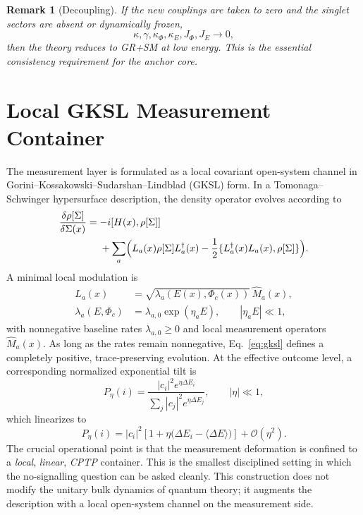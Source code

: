 \documentclass[aps,prd,twocolumn,superscriptaddress,nofootinbib]{revtex4-2}
\newtheorem{remark}{Remark}
\begin{document}
\begin{remark}[Decoupling]
If the new couplings are taken to zero and the singlet sectors are absent or dynamically frozen,
\begin{equation}
\kappa,\gamma,\kappa_{\Phi},\kappa_E,J_{\Phi},J_E\to 0,
\end{equation}
then the theory reduces to GR+SM at low energy. This is the essential consistency requirement for the anchor core.
\end{remark}

\section{Local GKSL Measurement Container}
The measurement layer is formulated as a local covariant open-system channel in Gorini--Kossakowski--Sudarshan--Lindblad (GKSL) form. In a Tomonaga--Schwinger hypersurface description, the density operator evolves according to
\begin{equation}
\begin{split}
\frac{\delta\rho[\Sigma]}{\delta\Sigma(x)} = {}&{-}i[H(x),\rho[\Sigma]] \\
&+ \sum_a \Bigl(L_a(x)\rho[\Sigma]L_a^{\dagger}(x)-\frac{1}{2}\{L_a^{\dagger}(x)L_a(x),\rho[\Sigma]\}\Bigr).
\end{split}
\label{eq:gksl}
\end{equation}
A minimal local modulation is
\begin{equation}
\begin{split}
L_a(x) &= \sqrt{\lambda_a(E(x),\Phi_c(x))}\,\hat M_a(x), \\
\lambda_a(E,\Phi_c) &= \lambda_{a,0}\exp(\eta_a E),\qquad |\eta_a E|\ll 1,
\end{split}
\label{eq:locallambda}
\end{equation}
with nonnegative baseline rates $\lambda_{a,0}\ge 0$ and local measurement operators $\hat M_a(x)$. As long as the rates remain nonnegative, Eq.~\eqref{eq:gksl} defines a completely positive, trace-preserving evolution. At the effective outcome level, a corresponding normalized exponential tilt is
\begin{equation}
P_{\eta}(i)=\frac{|c_i|^2 e^{\eta\Delta E_i}}{\sum_j |c_j|^2 e^{\eta\Delta E_j}},\qquad |\eta|\ll 1,
\label{eq:measuretilt}
\end{equation}
which linearizes to
\begin{equation}
P_{\eta}(i)=|c_i|^2\left[1+\eta\bigl(\Delta E_i-\langle \Delta E\rangle\bigr)\right]+\mathcal{O}(\eta^2).
\end{equation}
The crucial operational point is that the measurement deformation is confined to a \emph{local}, \emph{linear}, \emph{CPTP} container. This is the smallest disciplined setting in which the \mbox{no-signalling} question can be asked cleanly.
This construction does not modify the unitary bulk dynamics of quantum theory; it augments the description with a local open-system channel on the measurement side.
\end{document}
